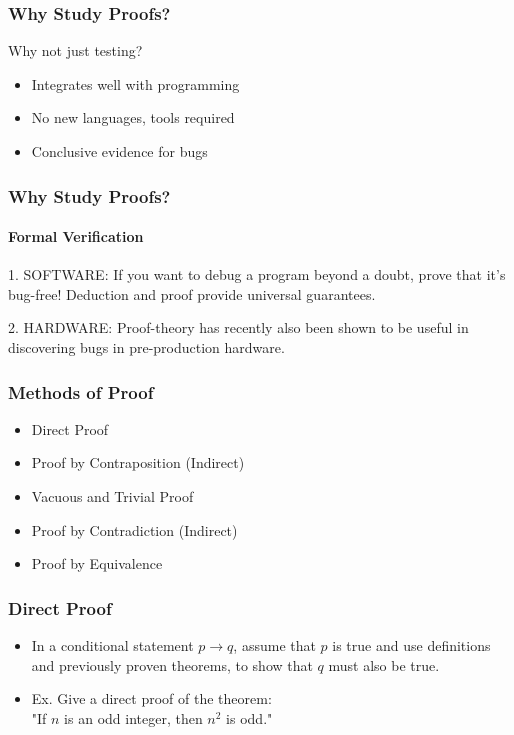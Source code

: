 \documentclass{beamer}
\begin{document}
\begin{frame}
\frametitle{Why Study Proofs?}
\Large
 \quad Why not just testing?
\begin{itemize}
\item Integrates well with programming
\item No new languages, tools required
\item Conclusive evidence for bugs
\end{itemize}
\end{frame}


\begin{frame}
\frametitle{Why Study Proofs?}
\framesubtitle{Formal Verification}
\Large
\begin{block}{1. SOFTWARE:}
If you want to debug a program beyond a doubt, prove that it's bug-free! Deduction and proof provide universal guarantees.
\end{block}

\begin{block}{2. HARDWARE:}
Proof-theory has recently also been shown to be useful in discovering bugs in pre-production hardware.
\end{block}
\end{frame}

 
\begin{frame}
\frametitle{Methods of Proof}
\begin{itemize} 
\huge
\item <1-> Direct Proof
\item <2-> Proof by Contraposition (Indirect)
\item <3-> Vacuous and Trivial Proof 
\item <4-> Proof by Contradiction (Indirect)
\item <5-> Proof by Equivalence
\end{itemize}
\end{frame}  


\begin{frame}
\frametitle{Direct Proof}
\begin{itemize} 
\Large
\item <1-> In a conditional statement $p \to q$, assume that $p$ is true and use definitions and previously proven theorems,  to show that $q$ must also be true.
\item <2-> Ex. Give a direct proof of the theorem: \\ "If $n$ is an odd integer, then $n^2$ is odd."
\end{itemize}
\end{frame}  
\end{document}

